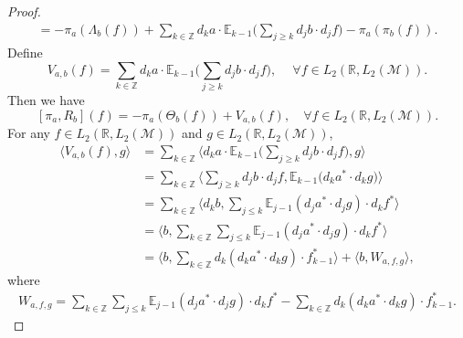 \documentclass[oneside,english,a4wide]{amsart}
\numberwithin{equation}{section}
\numberwithin{figure}{section}
\theoremstyle{plain}
\theoremstyle{plain}
\theoremstyle{definition}
\theoremstyle{plain}
\theoremstyle{remark}
\theoremstyle{definition}
\theoremstyle{remark}
\theoremstyle{definition}
\newcommand{\8}{\infty}
\begin{document}
\begin{proof}
\begin{equation*}
\begin{aligned}
			=-\pi_a(\varLambda_{{b}}({f}))+\sum_{k\in\mathbb{Z}} d_ka\cdot \mathbb{E}_{k-1}\biggl(\sum_{j\ge k} d_j{b}\cdot d_j{f}\biggr)-\pi_{a}(\pi_b(f)).
		\end{aligned}
	\end{equation*}
	Define 
	\begin{equation}
		V_{a,b}(f)=\sum_{k\in\mathbb{Z}} d_ka\cdot \mathbb{E}_{k-1}\biggl(\sum_{j\ge k} d_j{b}\cdot d_j{f}\biggr), \quad \ \forall  f\in L_2(\mathbb{R},L_2(\mathcal{M})).
	\end{equation}
	Then we have
	\begin{equation}\label{piarbf}
		[\pi_{a}, R_b](f)=-\pi_{a}(\Theta_b(f))+V_{a,b}(f), \quad \forall f \in L_2(\mathbb{R},L_2(\mathcal{M})).
	\end{equation}
	For any $f\in L_2(\mathbb{R},L_2(\mathcal{M}))$ and $g\in L_2(\mathbb{R},L_2(\mathcal{M}))$, 
	\begin{equation}\label{vabf}
		\begin{aligned}
			\langle V_{a,b}(f),g\rangle{}&=\sum_{k\in\mathbb{Z}}\biggl\langle d_ka\cdot \mathbb{E}_{k-1}\biggl(\sum_{j\ge k}d_jb\cdot d_jf\biggr),g\biggr\rangle\\
			&=\sum_{k\in\mathbb{Z}}\biggl\langle \sum_{j\ge k}d_jb\cdot d_jf, \mathbb{E}_{k-1}\biggl(d_k{a^*}\cdot d_kg\biggr)\biggr\rangle\\
			&=\sum_{k\in\mathbb{Z}}\biggl\langle d_kb,\sum_{j\le k}\mathbb{E}_{j-1}(d_ja^*\cdot d_jg)\cdot d_kf^*  \biggr\rangle\\
			&=\biggl\langle b,\sum_{k\in\mathbb{Z}}\sum_{j\le k}\mathbb{E}_{j-1}(d_ja^*\cdot d_jg)\cdot d_kf^*  \biggr\rangle\\
			&=\biggl\langle b,\sum_{k\in\mathbb{Z}}d_k(d_ka^*\cdot d_kg)\cdot f_{k-1}^*  \biggr\rangle+\langle b, W_{a,f,g}\rangle,
		\end{aligned}
	\end{equation}
	where 
	\begin{equation*}
		\begin{aligned}
			W_{a,f,g}=\sum_{k\in\mathbb{Z}}\sum_{j\le k}\mathbb{E}_{j-1}(d_ja^*\cdot d_jg)\cdot d_kf^*-\sum_{k\in\mathbb{Z}}d_k(d_ka^*\cdot d_kg)\cdot f_{k-1}^*.
		\end{aligned}

\end{equation*}
\end{proof}
\end{document}
